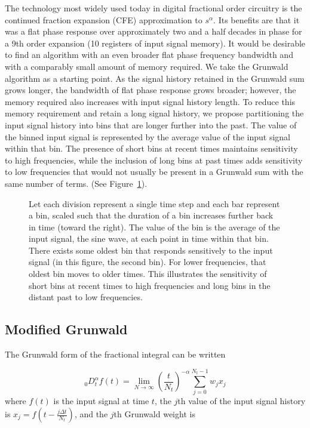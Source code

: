 The technology most widely used today in digital fractional order
circuitry is the continued fraction expansion (CFE) approximation to
$s^\alpha$. Its benefits are that it was a flat phase response over
approximately two and a half decades in phase for a 9th order
expansion (10 registers of input signal memory). It would be desirable
to find an algorithm with an even broader flat phase frequency
bandwidth and with a comparably small amount of memory required. We
take the Grunwald algorithm as a starting point. As the signal history
retained in the Grunwald sum grows longer, the bandwidth of flat phase
response grows broader; however, the memory required also increases
with input signal history length. To reduce this memory requirement
and retain a long signal history, we propose partitioning the input
signal history into bins that are longer further into the past. The
value of the binned input signal is represented by the average value
of the input signal within that bin. The presence of short bins at
recent times maintains sensitivity to high frequencies, while the
inclusion of long bins at past times adds sensitivity to low
frequencies that would not usually be present in a Grunwald sum with
the same number of terms. (See Figure~\ref{fig:freqScaling}).

\begin{figure}
\label{fig:freqScaling}
\caption{Let each division represent a single time step and each bar represent a bin, scaled such that the duration of a bin increases further back in time (toward the right). The value of the bin is the average of the input signal, the sine wave, at each point in time within that bin. There exists some oldest bin that responds sensitively to the input signal (in this figure, the second bin). For lower frequencies, that oldest bin moves to older times. This illustrates the sensitivity of short bins at recent times to high frequencies and long bins in the distant past to low frequencies.}
\end{figure}


\subsection{Modified Grunwald}

The Grunwald form of the fractional integral can be written~\cite{OldSpan:74}

\begin{equation}
_0D^\alpha_tf(t) = \displaystyle \lim_{N\to\infty} \left(\frac{t}{N_t}\right)^{-\alpha}
\displaystyle\sum\limits_{j=0}^{N_t-1} w_{j}x_j
\label{simpleGrunwald}
\end{equation}
where $f(t)$ is the input signal at time $t$, the $j$th value of the
input signal history is $x_j=f\left(t-\frac{j\Delta t}{N_t}\right)$, and the
$j$th Grunwald weight is

